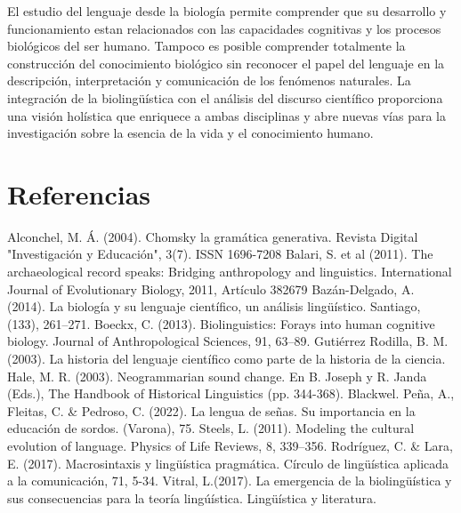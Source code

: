 \documentclass[12pt]{article}
\begin{document}
El estudio del lenguaje desde la biología permite comprender que su desarrollo y funcionamiento estan relacionados con las capacidades cognitivas y los procesos biológicos del ser humano. Tampoco es posible comprender totalmente la construcción del conocimiento biológico sin reconocer el papel del lenguaje en la descripción, interpretación y comunicación de los fenómenos naturales. La integración de la biolingüística con el análisis del discurso científico proporciona una visión holística que enriquece a ambas disciplinas y abre nuevas vías para la investigación sobre la esencia de la vida y el conocimiento humano.

\section{Referencias}

Alconchel, M. Á. (2004). Chomsky la gramática generativa. Revista Digital "Investigación y Educación", 3(7). ISSN 1696-7208
Balari, S. et al (2011). The archaeological record speaks: Bridging anthropology and linguistics. International Journal of Evolutionary Biology, 2011, Artículo 382679
Bazán-Delgado, A. (2014). La biología y su lenguaje científico, un análisis lingüístico. Santiago, (133), 261–271.
Boeckx, C. (2013). Biolinguistics: Forays into human cognitive biology. Journal of Anthropological Sciences, 91, 63–89.
Gutiérrez Rodilla, B. M. (2003). La historia del lenguaje científico como parte de la historia de la ciencia.
Hale, M. R. (2003). Neogrammarian sound change. En B. Joseph y R. Janda (Eds.), The Handbook of Historical Linguistics (pp. 344-368). Blackwel.
Peña, A., Fleitas, C. & Pedroso, C. (2022). La lengua de señas. Su importancia en la educación de sordos. (Varona), 75.
Steels, L. (2011). Modeling the cultural evolution of language. Physics of Life Reviews, 8, 339–356.
Rodríguez, C. & Lara, E. (2017). Macrosintaxis y lingüística pragmática. Círculo de lingüística aplicada a la comunicación, 71, 5-34.
Vitral, L.(2017). La emergencia de la biolingüística y sus consecuencias para la teoría lingúística. Lingüística y literatura.
\end{document}
